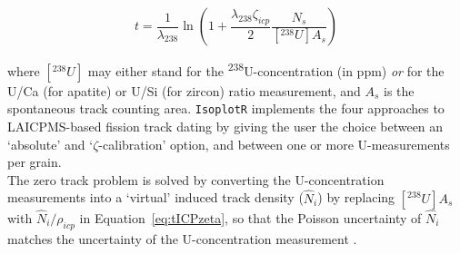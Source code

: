 \begin{refsection}
\begin{equation}
  t = \frac{1}{\lambda_{238}} \ln\left( 1 +
  \frac{\lambda_{238}\zeta_{icp}}{2} \frac{N_s}{[{}^{238}U] A_s} \right)
  \label{eq:tICPzeta}
\end{equation}

\noindent where $[{}^{238}U]$ may either stand for the
\textsuperscript{238}U-concentration (in ppm) \emph{or} for the U/Ca
(for apatite) or U/Si (for zircon) ratio measurement, and $A_s$ is the
spontaneous track counting area.  \texttt{IsoplotR} implements the
four approaches to LAICPMS-based fission track dating by giving the
user the choice between an `absolute' and `$\zeta$-calibration'
option, and between one or more U-measurements per grain.\\

The zero track problem is solved by converting the U-concentration
measurements into a `virtual' induced track density ($\hat{N}_i$) by
replacing $[{}^{238}U] A_s$ with $\hat{N}_i/\rho_{icp}$ in
Equation~\ref{eq:tICPzeta}, so that the Poisson uncertainty of
$\hat{N}_i$ matches the uncertainty of the U-concentration measurement
\citep{vermeesch2017}.


\printbibliography[heading=subbibliography]

\end{refsection}
